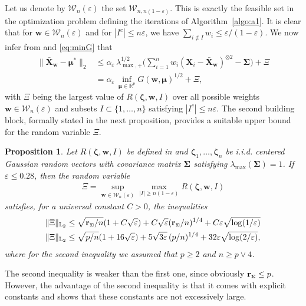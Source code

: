 \documentclass[aos,preprint,reqno]{imsart}
\newcommand\bs{\boldsymbol}
\newcommand\bmu{\boldsymbol\mu}
\newcommand\bzeta{\boldsymbol\zeta}
\newcommand\bSigma{\boldsymbol\Sigma}
\newcommand\bw{\boldsymbol w}
\newcommand\rSigma{\textbf{\textup{r}}_{\scriptscriptstyle\bSigma}}
\theoremstyle{plain}
\newtheorem{proposition}{Proposition}
\theoremstyle{remark}
\begin{document}
    Let us denote by $\mathcal W_n(\varepsilon)$ the set 
    $\mathcal W_{n,n(1-\varepsilon)}$. This is exactly the 
    feasible set in the optimization problem defining the 
    iterations of Algorithm~\ref{algo:a1}. It is clear that 
    for $\bw\in \mathcal W_n(\varepsilon)$ and for 
    $| I^c|\le n\varepsilon$, we have $\sum_{i\not\in 
     I} w_i\le \varepsilon/(1-\varepsilon)$. We now 
    infer from  and \eqref{eq:minG} that 
    \begin{align}
		\|\bar{\bs X}_{\bw} - {\bmu}^*\|_2 
		&\le \alpha_\varepsilon\,\lambda_{\max,+}^{1/2}
		\Big(\sum_{i=1}^n  w_i(\bs X_i - \bar{\bs X}_{\bw})
		^{\otimes 2} - \bSigma\Big) + \Xi\\
		& = \alpha_\varepsilon\, \inf_{\bmu\in\mathbb R^p}G(\bw,
		\bmu)^{1/2} + \Xi,
		\label{eq:fund3}
	\end{align}
	with $\Xi$ being the largest value of $R(\bzeta,\bw, I)$ 
	over all possible weights $\bw\in \mathcal W_n(\varepsilon)$ 
	and subsets $I\subset\{1,\ldots,n\}$ satisfying $| 
	I^c|\le n\varepsilon$. The second building block, formally 
	stated in the next proposition, provides a suitable upper
	bound for the random variable $\Xi$. 
	
	\begin{proposition}\label{proposition2}
	Let $R(\bzeta,\bw, I)$ be defined in  and 
	$\bzeta_1,\ldots,\bzeta_n$ be i.i.d. centered Gaussian random 
	vectors with covariance matrix $\bSigma$ satisfying 
	$\lambda_{\max}(\bSigma) = 1$. If $\varepsilon\le 0.28$, 
	then the random variable 
	\begin{align}
		\Xi = \sup_{\bw\in \mathcal W_n(\varepsilon)} 
		\max_{|I|\ge n(1-\varepsilon)} R(\bzeta,\bw, I)
	\end{align}
	satisfies, for a universal constant $C>0$, the inequalities 
	\begin{align}
		\|\Xi\|_{\mathbb L_2} &\le \sqrt{\rSigma/n}(1+ C
		\sqrt{\varepsilon}) + C\sqrt{\varepsilon}(\rSigma/n)^{1/4} 
		+ C\varepsilon\sqrt{\log(1/\varepsilon)} \label{ineq:xi1}\\
		\|\Xi\|_{\mathbb L_2} &\le \sqrt{p/n}(1+ 16\sqrt{\varepsilon})
		+ 5\sqrt{3\varepsilon}\,(p/n)^{1/4} + 
		32\varepsilon\sqrt{\log(2/\varepsilon)},\label{ineq:xi2}
	\end{align}
	where for the second inequality we assumed that $p\ge 2$ and
	$n\ge p\vee 4$.
	\end{proposition}
	
	The second inequality is weaker than the first one, since obviously $\rSigma \le p$. However, the advantage of the second inequality
	is that it comes with explicit constants and shows that these constants are not excessively large.
	
\end{document}

